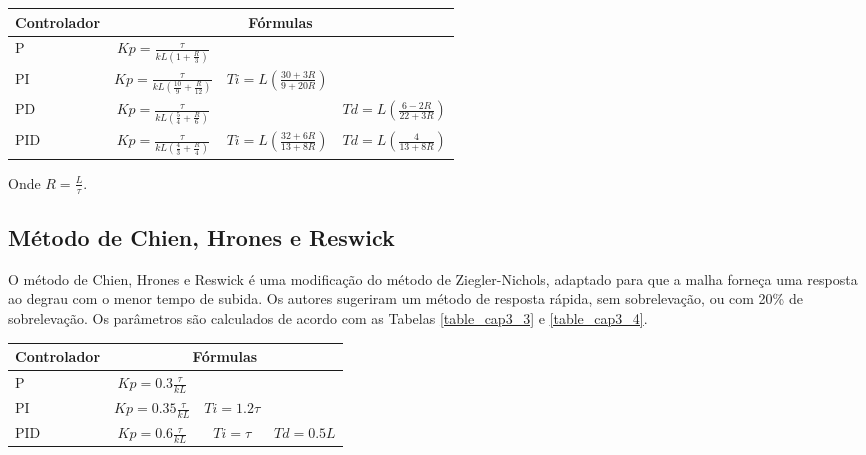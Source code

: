        \begin{center}
            \begin{tabular}{l*{3}{c}}
            \label{table_cap3_2}
Controlador & \multicolumn{3}{c}{Fórmulas} \\
\hline
P   & $Kp = \frac{\tau}{kL(1 + \frac{R}{3})}$             &              & \\
PI  & $Kp = \frac{\tau}{kL(\frac{10}{9} + \frac{R}{12})}$ & $Ti = L(\frac{30+3R}{9+20R})$ & \\
PD  & $Kp = \frac{\tau}{kL(\frac{5}{4} + \frac{R}{6})}$ & & $Td = L(\frac{6-2R}{22+3R})$ \\
PID & $Kp = \frac{\tau}{kL(\frac{4}{3} + \frac{R}{4})}$ & $Ti = L(\frac{32+6R}{13+8R})$ & $Td = L(\frac{4}{13+8R})$ \\
            \end{tabular}
        \end{center}
    
    Onde $R = \frac{L}{\tau}$.
    
    \subsection{Método de Chien, Hrones e Reswick}
        
        O método de Chien, Hrones e Reswick é uma modificação do método
        de Ziegler-Nichols, adaptado para que a malha forneça uma resposta ao
        degrau com o menor tempo de subida. Os autores sugeriram um método
        de resposta rápida, sem sobrelevação, ou com 20\% de sobrelevação.
        Os parâmetros são calculados de acordo com as Tabelas \ref{table_cap3_3}
        e \ref{table_cap3_4}.
        
        \newpage

        \begin{center}
            \begin{tabular}{l*{3}{c}}
            \label{table_cap3_3}
Controlador & \multicolumn{3}{c}{Fórmulas} \\
\hline
P   & $Kp = 0.3\frac{\tau}{kL}$     &              & \\
PI  & $Kp = 0.35\frac{\tau}{kL}$ & $Ti = 1.2\tau$ & \\
PID & $Kp = 0.6\frac{\tau}{kL}$ & $Ti = \tau$ & $Td = 0.5L$ \\
            \end{tabular}
        \end{center}

